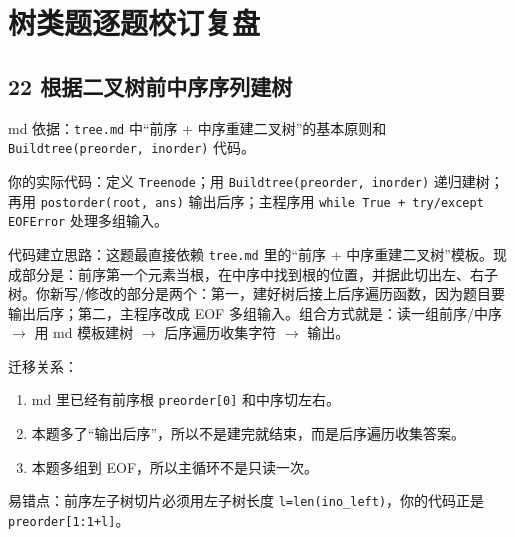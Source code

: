 \documentclass[10pt,a4paper,fontset=none]{ctexart}
\begin{document}
\section{树类题逐题校订复盘}

\subsection{22 根据二叉树前中序序列建树}
\begin{sourcebox}
md 依据：\texttt{tree.md} 中“前序 + 中序重建二叉树”的基本原则和 \texttt{Buildtree(preorder, inorder)} 代码。
\end{sourcebox}
\begin{methodbox}
你的实际代码：定义 \texttt{Treenode}；用 \texttt{Buildtree(preorder, inorder)} 递归建树；再用 \texttt{postorder(root, ans)} 输出后序；主程序用 \texttt{while True + try/except EOFError} 处理多组输入。

代码建立思路：这题最直接依赖 \texttt{tree.md} 里的“前序 + 中序重建二叉树”模板。现成部分是：前序第一个元素当根，在中序中找到根的位置，并据此切出左、右子树。你新写/修改的部分是两个：第一，建好树后接上后序遍历函数，因为题目要输出后序；第二，主程序改成 EOF 多组输入。组合方式就是：读一组前序/中序 $\rightarrow$ 用 md 模板建树 $\rightarrow$ 后序遍历收集字符 $\rightarrow$ 输出。
\end{methodbox}
迁移关系：
\begin{enumerate}
  \item md 里已经有前序根 \texttt{preorder[0]} 和中序切左右。
  \item 本题多了“输出后序”，所以不是建完就结束，而是后序遍历收集答案。
  \item 本题多组到 EOF，所以主循环不是只读一次。
\end{enumerate}
易错点：前序左子树切片必须用左子树长度 \texttt{l=len(ino\_left)}，你的代码正是 \texttt{preorder[1:1+l]}。
\end{document}
